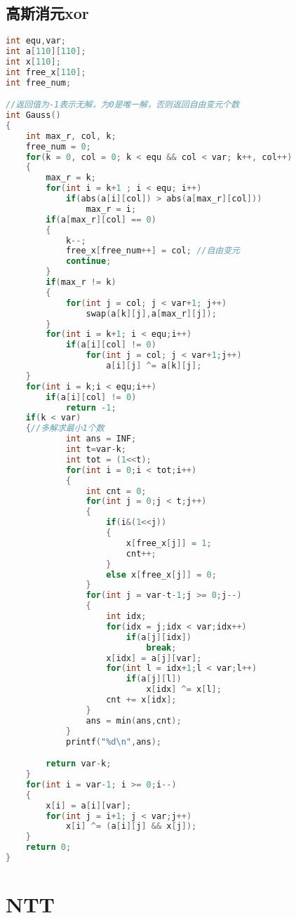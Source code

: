 \subsection{高斯消元xor}
\begin{lstlisting}[language=C++]
int equ,var;
int a[110][110];
int x[110];
int free_x[110];
int free_num;

//返回值为-1表示无解，为0是唯一解，否则返回自由变元个数
int Gauss()
{
    int max_r, col, k;
    free_num = 0;
    for(k = 0, col = 0; k < equ && col < var; k++, col++)
    {
        max_r = k;
        for(int i = k+1 ; i < equ; i++)
            if(abs(a[i][col]) > abs(a[max_r][col]))
                max_r = i;
        if(a[max_r][col] == 0)
        {
            k--;
            free_x[free_num++] = col; //自由变元
            continue;
        }
        if(max_r != k)
        {
            for(int j = col; j < var+1; j++)
                swap(a[k][j],a[max_r][j]);
        }
        for(int i = k+1; i < equ;i++)
            if(a[i][col] != 0)
                for(int j = col; j < var+1;j++)
                    a[i][j] ^= a[k][j];
    }
    for(int i = k;i < equ;i++)
        if(a[i][col] != 0)
            return -1;
    if(k < var)
    {//多解求最小1个数
            int ans = INF;
            int t=var-k;
            int tot = (1<<t);
            for(int i = 0;i < tot;i++)
            {
                int cnt = 0;
                for(int j = 0;j < t;j++)
                {
                    if(i&(1<<j))
                    {
                        x[free_x[j]] = 1;
                        cnt++;
                    }
                    else x[free_x[j]] = 0;
                }
                for(int j = var-t-1;j >= 0;j--)
                {
                    int idx;
                    for(idx = j;idx < var;idx++)
                        if(a[j][idx])
                            break;
                    x[idx] = a[j][var];
                    for(int l = idx+1;l < var;l++)
                        if(a[j][l])
                            x[idx] ^= x[l];
                    cnt += x[idx];
                }
                ans = min(ans,cnt);
            }
            printf("%d\n",ans);

        return var-k;
    }
    for(int i = var-1; i >= 0;i--)
    {
        x[i] = a[i][var];
        for(int j = i+1; j < var;j++)
            x[i] ^= (a[i][j] && x[j]);
    }
    return 0;
}
\end{lstlisting}

\section{NTT}
